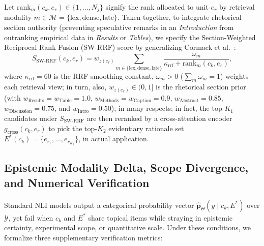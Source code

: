 \documentclass[journal]{IEEEtran}
\begin{document}
Let $\text{rank}_m(c_k, e_r) \in \{1, \dots, N_j\}$ signify the rank allocated to unit $e_r$ by retrieval modality $m \in \mathcal{M} = \{\text{lex}, \text{dense}, \text{late}\}$. Taken together, to integrate rhetorical section authority (preventing speculative remarks in an \emph{Introduction} from outranking empirical data in \emph{Results} or \emph{Tables}), we specify the Section-Weighted Reciprocal Rank Fusion (SW-RRF) score by generalizing Cormack et al.\ \cite{cormack2009reciprocal}:
\begin{equation}
S_{\text{SW-RRF}}(c_k, e_r) = w_{z(e_r)} \sum_{m \in \{\text{lex}, \text{dense}, \text{late}\}} \frac{\omega_m}{\kappa_{\text{rrf}} + \text{rank}_m(c_k, e_r)},
\label{eq:sw_rrf}
\end{equation}
where $\kappa_{\text{rrf}} = 60$ is the RRF smoothing constant, $\omega_m > 0$ ($\sum_m \omega_m = 1$) weights each retrieval view; in turn, also, $w_{z(e_r)} \in (0, 1]$ is the rhetorical section prior (with $w_{\text{Results}} = w_{\text{Table}} = 1.0$, $w_{\text{Methods}} = w_{\text{Caption}} = 0.9$, $w_{\text{Abstract}} = 0.85$, $w_{\text{Discussion}} = 0.75$, and $w_{\text{Intro}} = 0.50$), in many respects; in fact, the top-$K_1$ candidates under $S_{\text{SW-RRF}}$ are then reranked by a cross-attention encoder $g_{\text{cross}}(c_k, e_r)$ to pick the top-$K_2$ evidentiary rationale set $E^*(c_k) = \{e_{r_1}, \dots, e_{r_{K_2}}\}$, in actual application.

\subsection{Epistemic Modality Delta, Scope Divergence, and Numerical Verification}
Standard NLI models output a categorical probability vector $\hat{\mathbf{p}}_{\Theta}(y \mid c_k, E^*)$ over $\mathcal{Y}$, yet fail when $c_k$ and $E^*$ share topical items while straying in epistemic certainty, experimental scope, or quantitative scale. Under these conditions, we formalize three supplementary verification metrics:
\end{document}
